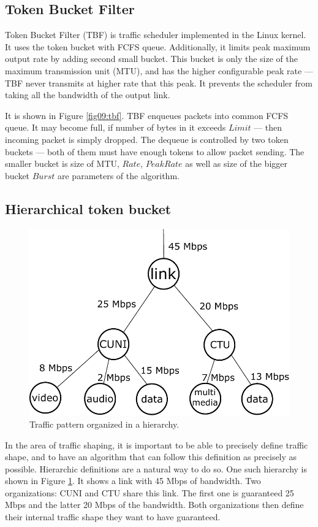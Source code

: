 \subsection{Token Bucket Filter}
Token Bucket Filter (TBF) is traffic scheduler implemented in the Linux kernel. It uses the token bucket with FCFS queue. Additionally, it limits peak maximum output rate by adding second small bucket. This bucket is only the size of the maximum transmission unit (MTU), and has the higher configurable peak rate --- TBF never transmits at higher rate that this peak. It prevents the scheduler from taking all the bandwidth of the output link.

It is shown in Figure \ref{fig09:tbf}. TBF enqueues packets into common FCFS queue. It may become full, if number of bytes in it exceeds $Limit$ --- then incoming packet is simply dropped. The dequeue is controlled by two token buckets --- both of them must have enough tokens to allow packet sending. The smaller bucket is size of MTU, $Rate$, $PeakRate$ as well as size of the bigger bucket $Burst$ are parameters of the algorithm.

\subsection{Hierarchical token bucket}
\begin{figure}
	\centering
	\includegraphics[width=137mm]{drawings/hierarchy}
	\caption{Traffic pattern organized in a hierarchy.}
	
	\label{fig10:hierarchy}
\end{figure}
In the area of traffic shaping, it is important to be able to precisely define traffic shape, and to have an algorithm that can follow this definition as precisely as possible. Hierarchic definitions are a natural way to do so. One such hierarchy is shown in Figure \ref{fig10:hierarchy}. It shows a link with 45 Mbps of bandwidth. Two organizations: CUNI and CTU share this link. The first one is guaranteed 25 Mbps and the latter 20 Mbps of the bandwidth. Both organizations then define their internal traffic shape they want to have guaranteed.

